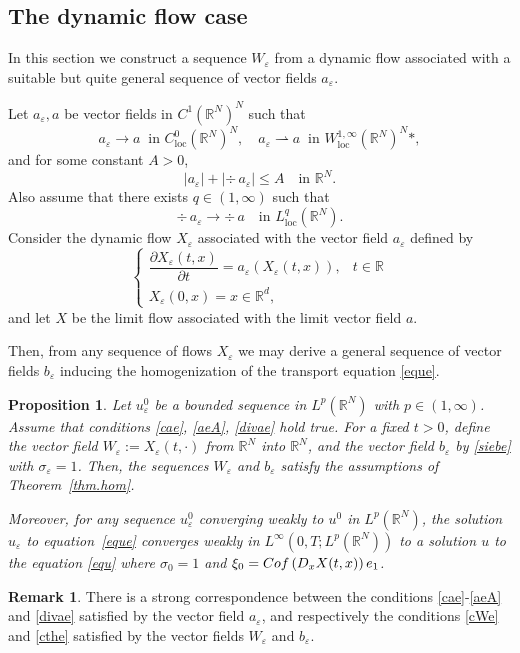 \documentclass[11pt]{article}
\newcommand{\loc}{\mathrm{loc}}
\def \RR {\mathbb R}
\theoremstyle{plain}
\newtheorem{Pro}[Thm]{Proposition}
\theoremstyle{definition}
\newtheorem{Rem}[Thm]{Remark}
\numberwithin{equation}{section}
\begin{document}
\subsection{The dynamic flow case}\label{ss.flow}
In this section we construct a sequence $W_\varepsilon$ from a dynamic flow associated with a suitable but quite general sequence of vector fields $a_\varepsilon$.

Let $a_\varepsilon,a$ be vector fields in $C^1(\RR^N)^N$ such that
\begin{equation}\label{cae}
a_\varepsilon \to a\;\;\mbox{in }C^0_\loc(\RR^N)^N,\quad a_\varepsilon\rightharpoonup a\;\;\mbox{in }W^{1,\infty}_\loc(\RR^N)^N\ast,
\end{equation}
and for some constant $A>0$,
\begin{equation}\label{aeA}
|a_\varepsilon|+|\div\,a_\varepsilon|\leq A\quad\mbox{in }\RR^N.
\end{equation}
Also assume that there exists $q\in(1,\infty)$ such that
\begin{equation}\label{divae}
\div\,a_\varepsilon\to \div\,a\quad\mbox{in }L^q_\loc(\RR^N).
\end{equation}
Consider the dynamic flow $X_\varepsilon$ associated with the vector field $a_\varepsilon$ defined by
\begin{equation}\label{Xeae}
\begin{cases}
\dfrac{\partial X_\varepsilon(t,x)}{\partial t}=a_\varepsilon(X_\varepsilon(t,x)), & t\in\RR
\\[5pt]
X_\varepsilon(0,x)=x\in\RR^d,
\end{cases}
\end{equation}
and let $X$ be the limit flow associated with the limit vector field $a$.

Then, from any sequence of flows $X_\varepsilon$ we may derive a general sequence of vector fields $b_\varepsilon$ inducing the homogenization of the transport equation \eqref{eque}.
\begin{Pro}\label{pro.ae}
Let $u_\varepsilon^0$ be a bounded sequence in $L^p(\RR^N)$ with $p\in(1,\infty)$.
Assume that conditions \eqref{cae}, \eqref{aeA}, \eqref{divae} hold true. For a fixed $t>0$, define the vector field $W_\varepsilon:=X_\varepsilon(t,\cdot)$ from $\RR^N$ into $\RR^N$, and the vector field $b_\varepsilon$ by \eqref{siebe} with $\sigma_\varepsilon=1$. Then, the sequences $W_\varepsilon$ and $b_\varepsilon$ satisfy the assumptions of Theorem~\ref{thm.hom}.

Moreover, for any sequence $u_\varepsilon^0$ converging weakly to $u^0$ in $L^p(\RR^N)$, the solution $u_\varepsilon$ to equation~\eqref{eque} converges weakly in $L^\infty(0,T;L^p(\RR^N))$ to a solution $u$ to the equation \eqref{equ} where $\sigma_0=1$ and $\xi_0={\rm Cof}\,(D_x X(t,x))\,e_1$.
\end{Pro}
\begin{Rem}
There is a strong correspondence between the conditions \eqref{cae}-\eqref{aeA} and \eqref{divae} satisfied by the vector field $a_\varepsilon$, and respectively the conditions \eqref{cWe} and \eqref{cthe} satisfied by the vector fields $W_\varepsilon$ and $b_\varepsilon$.
\end{Rem}
\end{document}
